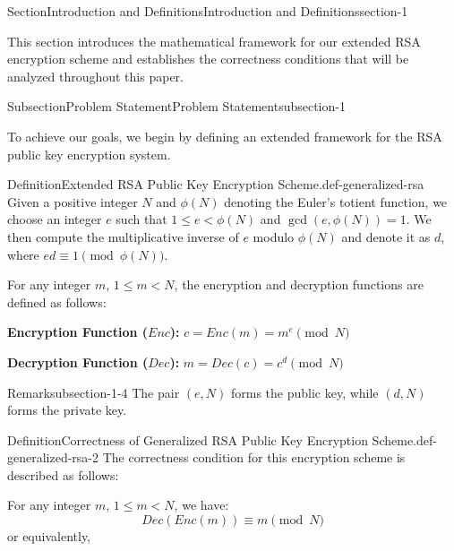 \documentclass[oneside,12pt,]{article}
\newcommand{\terminology}[1]{\textbf{#1}}
\numberwithin{equation}{section}
\begin{document}
\begin{sectionptx}{Section}{Introduction and Definitions}{}{Introduction and Definitions}{}{}{section-1}
\begin{introduction}{}%
This section introduces the mathematical framework for our extended RSA encryption scheme and establishes the correctness conditions that will be analyzed throughout this paper.%
\end{introduction}%
%
%
\typeout{************************************************}
\typeout{************************************************}
%
\begin{subsectionptx}{Subsection}{Problem Statement}{}{Problem Statement}{}{}{subsection-1}
\begin{introduction}{}%
To achieve our goals, we begin by defining an extended framework for the RSA public key encryption system.%
\end{introduction}%
\begin{definition}{Definition}{Extended RSA Public Key Encryption Scheme.}{def-generalized-rsa}%
Given a positive integer \(N\) and \(\phi(N)\) denoting the Euler's totient function, we choose an integer \(e\) such that \(1 \leq e < \phi(N)\) and \(\gcd(e, \phi(N)) = 1\). We then compute the multiplicative inverse of \(e\) modulo \(\phi(N)\) and denote it as \(d\), where \(ed \equiv 1 \pmod{\phi(N)}\).%
\par
For any integer \(m\), \(1 \leq m < N\), the encryption and decryption functions are defined as follows:%
\par
\terminology{Encryption Function (\(Enc\)):} \(c = Enc(m) = m^e \pmod N\)%
\par
\terminology{Decryption Function (\(Dec\)):} \(m = Dec(c) = c^d \pmod N\)%
\end{definition}
\begin{remark}{Remark}{}{subsection-1-4}%
The pair \((e, N)\) forms the public key, while \((d, N)\) forms the private key.%
\end{remark}
\begin{definition}{Definition}{Correctness of Generalized RSA Public Key Encryption Scheme.}{def-generalized-rsa-2}%
The correctness condition for this encryption scheme is described as follows:%
\par
For any integer \(m\), \(1 \leq m < N\), we have:%
%
\begin{equation}
Dec(Enc(m)) \equiv m \pmod{N}\label{eq-correctness}
\end{equation}
or equivalently,%

\end{definition}
\end{subsectionptx}
\end{sectionptx}
\end{document}
